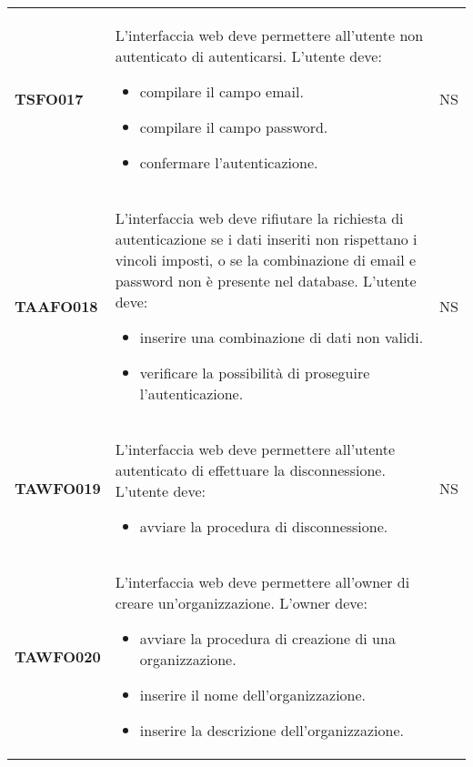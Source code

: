 \documentclass[../piano-di-qualifica.tex]{subfiles}
\begin{document}
\begin{centering}
\begin{longtable}[H]{>{\centering\bfseries}m{3cm} >{}p{10cm} >{\centering\arraybackslash}m{3cm}}
        TSFO017     & L'interfaccia web deve permettere all'utente non autenticato di autenticarsi. \newline
                      L'utente deve:
                        \begin{itemize}
                          \item compilare il campo email.
                          \item compilare il campo password.
                          \item confermare l'autenticazione.
                        \end{itemize}
                    & NS \\
        TAAFO018    & L'interfaccia web deve rifiutare la richiesta di autenticazione se i dati inseriti non rispettano i vincoli imposti, o se la combinazione di email e password non è presente nel database. \newline
                      L'utente deve:
                        \begin{itemize}
                          \item inserire una combinazione di dati non validi.
                          \item verificare la possibilità di proseguire l'autenticazione.
                        \end{itemize}
                    & NS \\
        TAWFO019    & L'interfaccia web deve permettere all'utente autenticato di effettuare la disconnessione. \newline
                      L'utente deve:
                        \begin{itemize}
                          \item avviare la procedura di disconnessione.
                        \end{itemize}
                    & NS \\
        TAWFO020    & L'interfaccia web deve permettere all'owner di creare un'organizzazione. \newline
                      L'owner deve:
                        \begin{itemize}
                          \item avviare la procedura di creazione di una organizzazione.
                          \item inserire il nome dell'organizzazione.
                          \item inserire la descrizione dell'organizzazione.

\end{itemize}
\end{longtable}
\end{centering}
\end{document}
